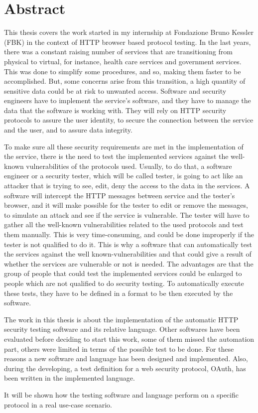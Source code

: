 \chapter*{Abstract} %

This thesis covers the work started in my internship at Fondazione Bruno Kessler (FBK) in the context of HTTP browser based protocol testing.
In the last years, there was a constant raising number of services that are transitioning from physical to virtual, for instance, health care services and government services. This was done to simplify some procedures, and so, making them faster to be accomplished. But, some concerns arise from this transition, a high quantity of sensitive data could be at risk to unwanted access. Software and security engineers have to implement the service's software, and they have to manage the data that the software is working with. They will rely on HTTP security protocols to assure the user identity, to secure the connection between the service and the user, and to assure data integrity. 

To make sure all these security requirements are met in the implementation of the service, there is the need to test the implemented services against the well-known vulnerabilities of the protocols used. Usually, to do that, a software engineer or a security tester, which will be called tester, is going to act like an attacker that is trying to see, edit, deny the access to the data in the services. A software will intercept the HTTP messages between service and the tester's browser, and it will make possible for the tester to edit or remove the messages, to simulate an attack and see if the service is vulnerable. The tester will have to gather all the well-known vulnerabilities related to the used protocols and test them manually. This is very time-consuming, and could be done improperly if the tester is not qualified to do it. This is why a software that can automatically test the services against the well known-vulnerabilities and that could give a result of whether the services are vulnerable or not is needed. The advantages are that the group of people that could test the implemented services could be enlarged to people which are not qualified to do security testing. To automatically execute these tests, they have to be defined in a format to be then executed by the software. 

The work in this thesis is about the implementation of the automatic HTTP security testing software and its relative language. Other softwares have been evaluated before deciding to start this work, some of them missed the automation part, others were limited in terms of the possible test to be done. For these reasons a new software and language has been designed and implemented. Also, during the developing, a test definition for a web security protocol, OAuth, has been written in the implemented language.

It will be shown how the testing software and language perform on a specific protocol in a real use-case scenario.




